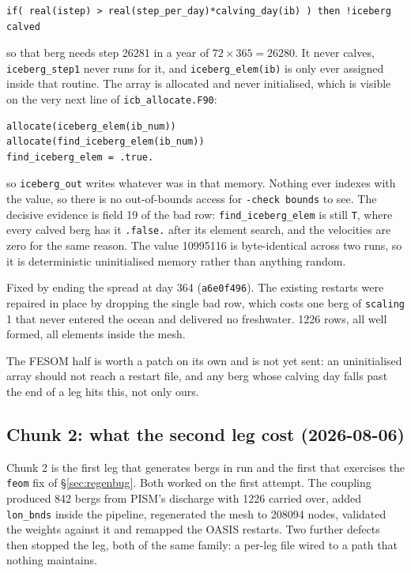 \documentclass[11pt,a4paper]{article}
\newcommand{\code}[1]{\texttt{\small #1}}
\begin{document}
\begin{verbatim}
if( real(istep) > real(step_per_day)*calving_day(ib) ) then !iceberg calved
\end{verbatim}

\noindent
so that berg needs step 26281 in a year of $72 \times 365 = 26280$. It never calves,
\code{iceberg\_step1} never runs for it, and \code{iceberg\_elem(ib)} is only ever assigned inside
that routine. The array is allocated and never initialised, which is visible on the very next line
of \code{icb\_allocate.F90}:

\begin{verbatim}
allocate(iceberg_elem(ib_num))
allocate(find_iceberg_elem(ib_num))
find_iceberg_elem = .true.
\end{verbatim}

\noindent
so \code{iceberg\_out} writes whatever was in that memory. Nothing ever indexes with the value, so
there is no out-of-bounds access for \code{-check bounds} to see. The decisive evidence is field 19
of the bad row: \code{find\_iceberg\_elem} is still \code{T}, where every calved berg has it
\code{.false.} after its element search, and the velocities are zero for the same reason. The value
10995116 is byte-identical across two runs, so it is deterministic uninitialised memory rather than
anything random.

Fixed by ending the spread at day 364 (\code{a6e0f496}). The existing restarts were repaired in
place by dropping the single bad row, which costs one berg of \code{scaling} 1 that never entered
the ocean and delivered no freshwater. 1226 rows, all well formed, all elements inside the mesh.

The FESOM half is worth a patch on its own and is not yet sent: an uninitialised array should not
reach a restart file, and any berg whose calving day falls past the end of a leg hits this,
not only ours.

\subsection{Chunk 2: what the second leg cost (2026-08-06)}
\label{sec:chunk2}

Chunk 2 is the first leg that generates bergs in run and the first that exercises the \code{feom}
fix of \S\ref{sec:regenbug}. Both worked on the first attempt. The coupling produced 842 bergs from
PISM's discharge with 1226 carried over, added \code{lon\_bnds} inside the pipeline, regenerated the
mesh to 208094 nodes, validated the weights against it and remapped the OASIS restarts. Two
further defects then stopped the leg, both of the same family: a per-leg file wired to a path that
nothing maintains.
\end{document}

